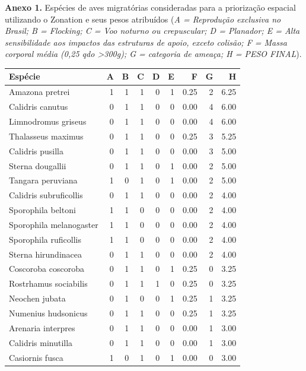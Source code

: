 \documentclass[
]{scrbook}
\begin{document}
\textbf{Anexo 1.} Espécies de aves migratórias consideradas para a priorização espacial utilizando o Zonation e seus pesos atribuídos (\emph{A = Reprodução exclusiva no Brasil; B = Flocking; C = Voo noturno ou crepuscular; D = Planador; E = Alta sensibilidade aos impactos das estruturas de apoio, exceto colisão; F = Massa corporal média (0,25 qdo \textgreater300g); G = categoria de ameaça; H = PESO FINAL}).

\begin{table}
\centering
\begin{tabular}{lrrrrrrrr}
\toprule
Espécie & A & B & C & D & E & F & G & H\\
\midrule
Amazona pretrei & 1 & 1 & 1 & 0 & 1 & 0.25 & 2 & 6.25\\
Calidris canutus & 0 & 1 & 1 & 0 & 0 & 0.00 & 4 & 6.00\\
Limnodromus griseus & 0 & 1 & 1 & 0 & 0 & 0.00 & 4 & 6.00\\
Thalasseus maximus & 0 & 1 & 1 & 0 & 0 & 0.25 & 3 & 5.25\\
Calidris pusilla & 0 & 1 & 1 & 0 & 0 & 0.00 & 3 & 5.00\\
\addlinespace
Sterna dougallii & 0 & 1 & 1 & 0 & 1 & 0.00 & 2 & 5.00\\
Tangara peruviana & 1 & 0 & 1 & 0 & 1 & 0.00 & 2 & 5.00\\
Calidris subruficollis & 0 & 1 & 1 & 0 & 0 & 0.00 & 2 & 4.00\\
Sporophila beltoni & 1 & 1 & 0 & 0 & 0 & 0.00 & 2 & 4.00\\
Sporophila melanogaster & 1 & 1 & 0 & 0 & 0 & 0.00 & 2 & 4.00\\
\addlinespace
Sporophila ruficollis & 1 & 1 & 0 & 0 & 0 & 0.00 & 2 & 4.00\\
Sterna hirundinacea & 0 & 1 & 1 & 0 & 0 & 0.00 & 2 & 4.00\\
Coscoroba coscoroba & 0 & 1 & 1 & 0 & 1 & 0.25 & 0 & 3.25\\
Rostrhamus sociabilis & 0 & 1 & 1 & 1 & 0 & 0.25 & 0 & 3.25\\
Neochen jubata & 0 & 1 & 0 & 0 & 1 & 0.25 & 1 & 3.25\\
\addlinespace
Numenius hudsonicus & 0 & 1 & 1 & 0 & 0 & 0.25 & 1 & 3.25\\
Arenaria interpres & 0 & 1 & 1 & 0 & 0 & 0.00 & 1 & 3.00\\
Calidris minutilla & 0 & 1 & 1 & 0 & 0 & 0.00 & 1 & 3.00\\
Casiornis fusca & 1 & 0 & 1 & 0 & 1 & 0.00 & 0 & 3.00\\

\end{tabular}
\end{table}
\end{document}
